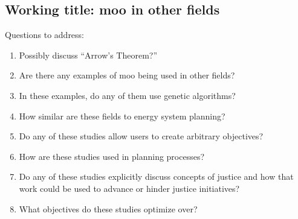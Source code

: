 \subsection{Working title: \Ac{moo} in other fields}

Questions to address:

\begin{enumerate}
    \item Possibly discuss ``Arrow's Theorem?'' \cite{franssen_arrows_2005}
    \item Are there any examples of \ac{moo} being used in other fields?
    \item In these examples, do any of them use genetic algorithms?
    \item How similar are these fields to energy system planning?
    \item Do any of these studies allow users to create arbitrary objectives?
    \item How are these studies used in planning processes?
    \item Do any of these studies explicitly discuss concepts of justice and how
    that work could be used to advance or hinder justice initiatives?
    \item What objectives do these studies optimize over?
\end{enumerate}